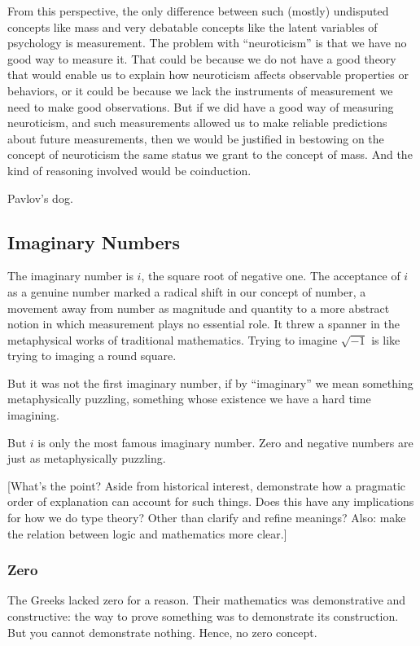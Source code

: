 \documentclass{article}
\begin{document}
From this perspective, the only difference between such (mostly)
undisputed concepts like mass and very debatable concepts like the
latent variables of psychology is measurement. The problem with
``neuroticism'' is that we have no good way to measure it. That could
be because we do not have a good theory that would enable us to
explain how neuroticism affects observable properties or behaviors, or
it could be because we lack the instruments of measurement we need to
make good observations. But if we did have a good way of measuring
neuroticism, and such measurements allowed us to make reliable
predictions about future measurements, then we would be justified in
bestowing on the concept of neuroticism the same status we grant to
the concept of mass. And the kind of reasoning involved would be
coinduction.

Pavlov's dog.

\subsection{Imaginary Numbers}

The imaginary number is \(i\), the square root of negative one. The
acceptance of \(i\) as a genuine number marked a radical shift in our
concept of number, a movement away from number as magnitude and
quantity to a more abstract notion in which measurement plays no
essential role. It threw a spanner in the metaphysical works of
traditional mathematics. Trying to imagine \(\sqrt{-1}\) is like
trying to imaging a round square.

But it was not the first imaginary number, if by ``imaginary'' we mean
something metaphysically puzzling, something whose existence we have a
hard time imagining.

But \(i\) is only the most famous imaginary number. Zero and negative
numbers are just as metaphysically puzzling.

[What's the point? Aside from historical interest, demonstrate how a
  pragmatic order of explanation can account for such things. Does
  this have any implications for how we do type theory? Other than
  clarify and refine meanings?  Also: make the relation between logic and mathematics more clear.]

\subsubsection{Zero}

The Greeks lacked zero for a reason. Their mathematics was
demonstrative and constructive: the way to prove something was to
demonstrate its construction. But you cannot demonstrate nothing.
Hence, no zero concept.
\end{document}
